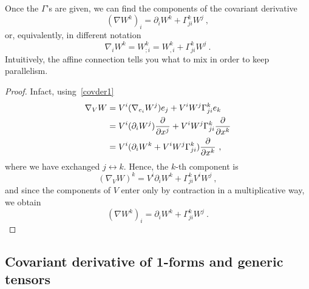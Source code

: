     Once the $\Gamma$'s are given, we can find the components of the covariant derivative 
    \begin{equation}\label{covder}
        (\nabla W^k)_i = \partial_i W^k + \Gamma^k_{ji} W^j ~,
    \end{equation}
    or, equivalently, in different notation
    \begin{equation*}
        \nabla_i W^k = W^k_{;i} = W^k_{,i} + \Gamma^k_{ji} W^j ~.
    \end{equation*}
    Intuitively, the affine connection tells you what to mix in order to keep parallelism.
    \begin{proof}
        Infact, using~\eqref{covder1}
        \begin{equation*}
        \begin{aligned}
            \nabla_V W & = V^i (\nabla_{e_i} W^j) e_j + V^i W^j \Gamma^k_{ji} e_k \\ & = V^i (\partial_i W^j) \frac{\partial}{\partial x^j} + V^i W^j \Gamma^k_{ji} \frac{\partial}{\partial x^k} \\ & = V^i (\partial_i W^k + V^i W^j \Gamma^k_{ji}) \frac{\partial}{\partial x^k} ~,
        \end{aligned}
        \end{equation*}
        where we have exchanged $j \leftrightarrow k$. Hence, the $k$-th component is
        \begin{equation*}
            (\nabla_V W)^k = V^i \partial_i W^k + \Gamma^k_{ji} V^i W^j ~,
        \end{equation*}
        and since the components of $V$ enter only by contraction in a multiplicative way, we obtain
        \begin{equation*}
            (\nabla W^k)_i = \partial_i W^k + \Gamma^k_{ji} W^j ~.
        \end{equation*}
    \end{proof}

\subsection{Covariant derivative of 1-forms and generic tensors}

